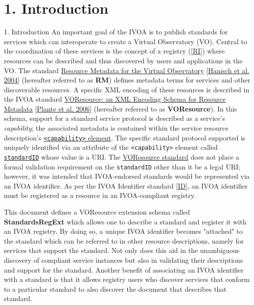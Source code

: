 \documentclass[11pt,a4paper]{ivoa}
\begin{document}
{{\section{1. Introduction}

\label{Intro}

1. Introduction
An important goal of the IVOA is to publish standards for services
which can interoperate to create a Virtual Observatory (VO).  Central
to the coordination of these services is the concept of a registry
([\href{#r:ri}{RI}]) where resources can be described and thus
discovered by users and applications in the VO.  The standard
\href{http://www.ivoa.net/Documents/REC/ResMetadata/RM-20040426.htm}{Resource
Metadata for the Virtual Observatory} [\href{#RM}{Hanisch et
al. 2004}] (hereafter referred to as \textbf{RM}) defines
metadata terms for services and other discoverable resources.  A
specific XML encoding of these resources is described in the IVOA standard
\href{http://www.ivoa.net/Documents/latest/VOResource.html}{VOResource:
an XML Encoding Schema for Resource Metadata} [\href{#VR}{Plante
et al. 2006}] (hereafter referred to as \textbf{VOResource}).
In this schema, support for a standard service protocol is described
as a service's \emph{capability}; the associated metadata is
contained within the service resource description's
\href{#d:Service}{\texttt{<capability>} element}.  The
specific standard protocol supported is uniquely identified via an
attribute of the \texttt{<capability>} element called
\href{http://www.ivoa.net/Documents/REC/ReR/VOResource-20080222.html#capability-xsi:type}{\texttt{standardID}}
whose value is a URI.  The \href{#VR}{VOResource standard} does
not place a formal validation requirement on the
\texttt{standardID} other than it be a legal URI; however, it
was intended that IVOA-endorsed standards would be represented via an
IVOA identifier.  As per the IVOA Identifier standard
[\href{#ID}{ID}], an IVOA identifier must be registered as a
resource in an IVOA-compliant registry.  



This document defines a VOResource extension schema called
\textbf{StandardsRegExt} which allows one to describe a standard
and register it with an IVOA registry.  By doing so, a unique IVOA
identifier becomes "attached" to the standard which can be referred to
in other resource descriptions, namely for services that support the
standard.  Not only does this aid in the unambiguous discovery of
compliant service instances but also in validating their descriptions
and support for the standard.  Another benefit of associating an IVOA
identifier with a standard is that it allows registry users who discover
services that conform to a particular standard to also discover the
document that describes that standard.



}}
\end{document}
